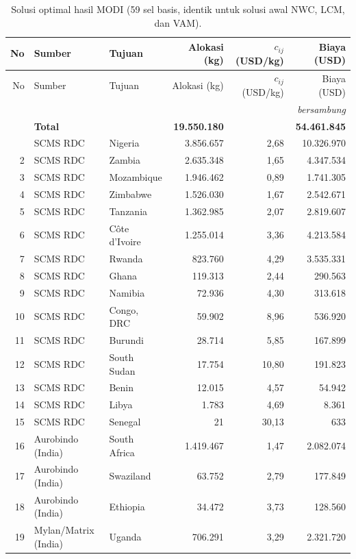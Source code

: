 \documentclass[a4paper,11pt]{article}
\begin{document}
{\small\setlength{\tabcolsep}{2.5pt}
\begin{longtable}{@{}r l l r r r@{}}
\caption{Solusi optimal hasil MODI (59 sel basis, identik untuk solusi awal NWC, LCM, dan VAM).}\label{tab:optimal}\\
\toprule
No & Sumber & Tujuan & Alokasi (kg) & $c_{ij}$ (USD/kg) & Biaya (USD) \\
\midrule
\endfirsthead
\toprule
No & Sumber & Tujuan & Alokasi (kg) & $c_{ij}$ (USD/kg) & Biaya (USD) \\
\midrule
\endhead
\midrule \multicolumn{6}{r}{\textit{bersambung}}\\
\endfoot
\midrule
 & \textbf{Total} & & \textbf{19.550.180} & & \textbf{54.461.845}\\
\bottomrule
\endlastfoot
1 & SCMS RDC & Nigeria & 3.856.657 & 2,68 & 10.326.970 \\
2 & SCMS RDC & Zambia & 2.635.348 & 1,65 & 4.347.534 \\
3 & SCMS RDC & Mozambique & 1.946.462 & 0,89 & 1.741.305 \\
4 & SCMS RDC & Zimbabwe & 1.526.030 & 1,67 & 2.542.671 \\
5 & SCMS RDC & Tanzania & 1.362.985 & 2,07 & 2.819.607 \\
6 & SCMS RDC & C\^ote d'Ivoire & 1.255.014 & 3,36 & 4.213.584 \\
7 & SCMS RDC & Rwanda & 823.760 & 4,29 & 3.535.331 \\
8 & SCMS RDC & Ghana & 119.313 & 2,44 & 290.563 \\
9 & SCMS RDC & Namibia & 72.936 & 4,30 & 313.618 \\
10 & SCMS RDC & Congo, DRC & 59.902 & 8,96 & 536.920 \\
11 & SCMS RDC & Burundi & 28.714 & 5,85 & 167.899 \\
12 & SCMS RDC & South Sudan & 17.754 & 10,80 & 191.823 \\
13 & SCMS RDC & Benin & 12.015 & 4,57 & 54.942 \\
14 & SCMS RDC & Libya & 1.783 & 4,69 & 8.361 \\
15 & SCMS RDC & Senegal & 21 & 30,13 & 633 \\
16 & Aurobindo (India) & South Africa & 1.419.467 & 1,47 & 2.082.074 \\
17 & Aurobindo (India) & Swaziland & 63.752 & 2,79 & 177.849 \\
18 & Aurobindo (India) & Ethiopia & 34.472 & 3,73 & 128.560 \\
19 & Mylan/Matrix (India) & Uganda & 706.291 & 3,29 & 2.321.720 \\

\end{longtable}}
\end{document}
